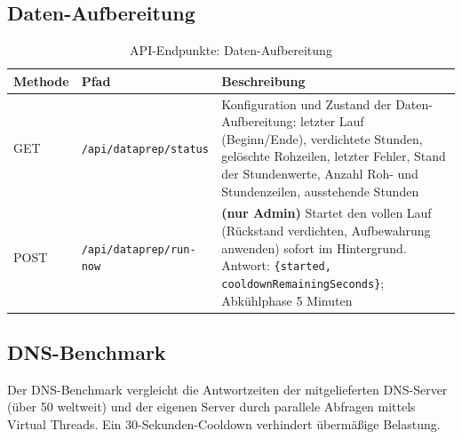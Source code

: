 \subsection{Daten-Aufbereitung}

\begin{table}[h]
\centering
\small
\begin{tabular}{|l|l|p{7cm}|}
\hline
\textbf{Methode} & \textbf{Pfad} & \textbf{Beschreibung} \\
\hline
GET & \texttt{/api/dataprep/status} & Konfiguration und Zustand der Daten-Aufbereitung:
  letzter Lauf (Beginn/Ende), verdichtete Stunden, gelöschte Rohzeilen, letzter Fehler,
  Stand der Stundenwerte, Anzahl Roh- und Stundenzeilen, ausstehende Stunden \\
\hline
POST & \texttt{/api/dataprep/run-now} & \textbf{(nur Admin)} Startet den vollen Lauf (Rückstand verdichten,
  Aufbewahrung anwenden) sofort im Hintergrund.
  Antwort: \texttt{\{started, cooldownRemainingSeconds\}}; Abkühlphase 5 Minuten \\
\hline
\end{tabular}
\caption{API-Endpunkte: Daten-Aufbereitung}
\end{table}

\subsection{DNS-Benchmark}

Der DNS-Benchmark vergleicht die Antwortzeiten der mitgelieferten DNS-Server
(über 50 weltweit) und der eigenen Server durch parallele Abfragen mittels Virtual
Threads. Ein 30-Sekunden-Cooldown verhindert übermäßige Belastung.

